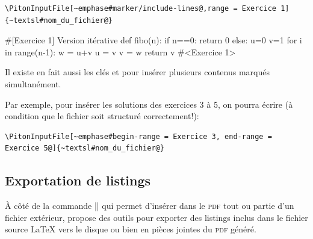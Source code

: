 \documentclass[dvipsnames,svgnames]{article}
\begin{document}
\begin{Verbatim}
\PitonInputFile[~emphase#marker/include-lines@,range = Exercice 1]{~textsl#nom_du_fichier@}
\end{Verbatim}

\begin{Piton}
#[Exercice 1] Version itérative
def fibo(n):
    if n==0: return 0 
    else:
        u=0
        v=1
        for i in range(n-1):
            w = u+v
            u = v
            v = w
        return v
#<Exercice 1>
\end{Piton}


\bigskip
{}  Il existe en fait aussi les clés
 et  pour insérer plusieurs contenus marqués
simultanément.

Par exemple, pour insérer les solutions des exercices 3 à 5, on pourra écrire (à condition
que le fichier soit structuré correctement!):

\begin{Verbatim}
\PitonInputFile[~emphase#begin-range = Exercice 3, end-range = Exercice 5@]{~textsl#nom_du_fichier@}
\end{Verbatim}


\subsection{Exportation de listings}

À côté de la commande |\PitonInputFile| qui permet d'insérer dans le \textsc{pdf} 
tout ou partie d'un fichier extérieur,  propose des outils pour exporter
des listings inclus dans le fichier source LaTeX vers le disque ou bien en pièces jointes
du \textsc{pdf} généré.
\end{document}
